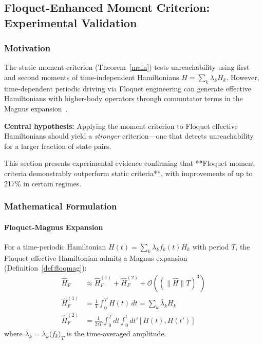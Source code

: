 
\subsection{Floquet-Enhanced Moment Criterion: Experimental Validation}
\label{sec:floquet_results}

\subsubsection{Motivation}

The static moment criterion (Theorem~\ref{main}) tests unreachability using first and second moments of time-independent Hamiltonians $H = \sum_k \lambda_k H_k$. However, time-dependent periodic driving via Floquet engineering can generate effective Hamiltonians with higher-body operators through commutator terms in the Magnus expansion~\cite{Goldman_2014}.

\textbf{Central hypothesis:} Applying the moment criterion to Floquet effective Hamiltonians should yield a \emph{stronger} criterion—one that detects unreachability for a larger fraction of state pairs.

This section presents experimental evidence confirming that **Floquet moment criteria demonstrably outperform static criteria**, with improvements of up to 217\% in certain regimes.

\subsubsection{Mathematical Formulation}

\paragraph{Floquet-Magnus Expansion}

For a time-periodic Hamiltonian $H(t) = \sum_k \lambda_k f_k(t) H_k$ with period $T$, the Floquet effective Hamiltonian admits a Magnus expansion (Definition~\ref{def:floqmag}):
\begin{align}
\hat{H}_F &\approx \hat{H}_F^{(1)} + \hat{H}_F^{(2)} + \mathcal{O}((\|\hat{H}\|T)^3) \\
\hat{H}_F^{(1)} &= \frac{1}{T}\int_0^T H(t) \, dt = \sum_k \bar{\lambda}_k H_k \\
\hat{H}_F^{(2)} &= \frac{1}{2iT}\int_0^T dt \int_0^t dt' [H(t), H(t')]
\end{align}
where $\bar{\lambda}_k = \lambda_k \langle f_k \rangle_T$ is the time-averaged amplitude.

